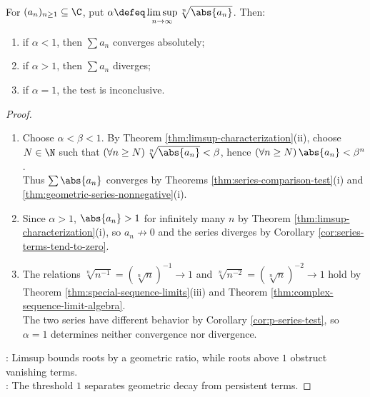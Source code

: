 \begin{theorem} \label{thm:root-test} \\
For $(a_n)_{n\geq1}\subseteq\C$, put $\alpha\defeq\limsup\limits_{n\to\infty}\sqrt[n]{\abs{a_n}}$. Then:
\begin{enumerate}[label=(\roman*)]
\setlength{\itemsep}{0pt}
\item if $\alpha<1$, then $\sum a_n$ converges absolutely;
\item if $\alpha>1$, then $\sum a_n$ diverges;
\item if $\alpha=1$, the test is inconclusive.
\end{enumerate}
\begin{proof}
\begin{enumerate}[label=(\roman*)]
\setlength{\itemsep}{0pt}
\item Choose $\alpha<\beta<1$. By Theorem \ref{thm:limsup-characterization}(ii), choose $N\in\N$ such that $(\forall n\geq N)\,\sqrt[n]{\abs{a_n}}<\beta$, hence $(\forall n\geq N)\,\abs{a_n}<\beta^n$.\\
Thus $\sum\abs{a_n}$ converges by Theorems \ref{thm:series-comparison-test}(i) and \ref{thm:geometric-series-nonnegative}(i).
\item Since $\alpha>1$, $\abs{a_n}>1$ for infinitely many $n$ by Theorem \ref{thm:limsup-characterization}(i), so $a_n\not\to0$ and the series diverges by Corollary \ref{cor:series-terms-tend-to-zero}.
\item The relations $\sqrt[n]{n^{-1}}=(\sqrt[n]{n})^{-1}\to1$ and $\sqrt[n]{n^{-2}}=(\sqrt[n]{n})^{-2}\to1$ hold by Theorem \ref{thm:special-sequence-limits}(iii) and Theorem \ref{thm:complex-sequence-limit-algebra}.\\
The two series have different behavior by Corollary \ref{cor:p-series-test}, so $\alpha=1$ determines neither convergence nor divergence.
\end{enumerate}
: Limsup bounds roots by a geometric ratio, while roots above $1$ obstruct vanishing terms.\\
: The threshold $1$ separates geometric decay from persistent terms.
\end{proof}
\end{theorem}

